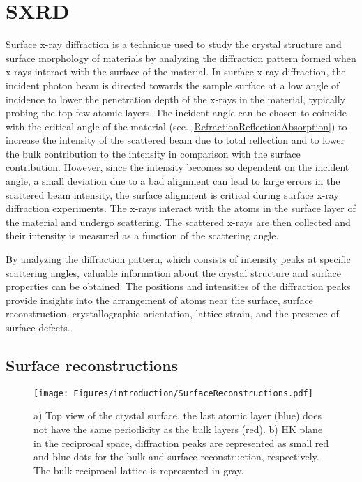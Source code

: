 \section{SXRD} \label{SXRD}

Surface x-ray diffraction is a technique used to study the crystal structure and surface morphology of materials by analyzing the diffraction pattern formed when x-rays interact with the surface of the material.
In surface x-ray diffraction, the incident photon beam is directed towards the sample surface at a low angle of incidence to lower the penetration depth of the x-rays in the material, typically probing the top few atomic layers.
The incident angle can be chosen to coincide with the critical angle of the material (sec. \ref{RefractionReflectionAbsorption}) to increase the intensity of the scattered beam due to total reflection and to lower the bulk contribution to the intensity in comparison with the surface contribution.
However, since the intensity becomes so dependent on the incident angle, a small deviation due to a bad alignment can lead to large errors in the scattered beam intensity, the surface alignment is critical during surface x-ray diffraction experiments.
The x-rays interact with the atoms in the surface layer of the material and undergo scattering.
The scattered x-rays are then collected and their intensity is measured as a function of the scattering angle.

By analyzing the diffraction pattern, which consists of intensity peaks at specific scattering angles, valuable information about the crystal structure and surface properties can be obtained.
The positions and intensities of the diffraction peaks provide insights into the arrangement of atoms near the surface, surface reconstruction, crystallographic orientation, lattice strain, and the presence of surface defects.

\subsection{Surface reconstructions}

\begin{figure}[!htb]
    \centering
    \texttt{[image: Figures/introduction/SurfaceReconstructions.pdf]}
    \caption{
    a) Top view of the crystal surface, the last atomic layer (blue) does not have the same periodicity as the bulk layers (red).
    b) HK plane in the reciprocal space, diffraction peaks are represented as small red and blue dots for the bulk and surface reconstruction, respectively. The bulk reciprocal lattice is represented in gray.
    }
    \label{fig:SurfaceReconstructions}
\end{figure}

